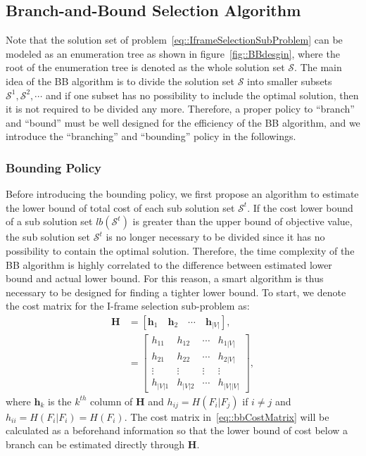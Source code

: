 \subsection{Branch-and-Bound Selection Algorithm}
Note that the solution set of problem~\eqref{eq::IframeSelectionSubProblem} can be modeled as an enumeration tree as shown in figure~\ref{fig::BBdesgin}, where the root of the enumeration tree is denoted as the whole solution set $\mathcal{S}$.
The main idea of the BB algorithm is to divide the solution set $\mathcal{S}$ into smaller subsets $\mathcal{S}^1, \mathcal{S}^2, \cdots$ and if one subset has no possibility to include the optimal solution, then it is not required to be divided any more.
Therefore, a proper policy to ``branch'' and ``bound'' must be well designed for the efficiency of the BB algorithm, and we introduce the ``branching'' and ``bounding'' policy in the followings.
%
\subsubsection{Bounding Policy}
Before introducing the bounding policy, we first propose an algorithm to estimate the lower bound of total cost of each sub solution set $\mathcal{S}^t$.
If the cost lower bound of a sub solution set $lb(\mathcal{S}^t)$ is greater than the upper bound of objective value, the sub solution set $\mathcal{S}^t$ is no longer necessary to be divided since it has no possibility to contain the optimal solution.
Therefore, the time complexity of the BB algorithm is highly correlated to the difference between estimated lower bound and actual lower bound.
For this reason, a smart algorithm is thus necessary to be designed for finding a tighter lower bound.
To start, we denote the cost matrix for the I-frame selection sub-problem as:
\begin{align}
\mathbf{H}
&= \left[ \mathbf{h}_1 \quad \mathbf{h}_2 \quad \cdots \quad \mathbf{h}_{|V|} \right], \nonumber \\
&= \left[ \begin{array}{cccc}
h_{11} &h_{12} &\cdots &h_{1|V|} \\
h_{21} &h_{22} &\cdots &h_{2|V|} \\
\vdots &\vdots &\vdots &\vdots \\
h_{|V|1} &h_{|V|2} &\cdots &h_{|V||V|}
\end{array} \right],
\label{eq::bbCostMatrix}
\end{align}
where $\mathbf{h}_k$ is the $k^{th}$ column of $\mathbf{H}$ and ${h_{ij} = H(F_i|F_j)}$ if ${i \neq j}$ and ${h_{ii}=H(F_i|F_i)=H(F_i)}$.
The cost matrix in~\eqref{eq::bbCostMatrix} will be calculated as a beforehand information so that the lower bound of cost below a branch can be estimated directly through $\mathbf{H}$.

